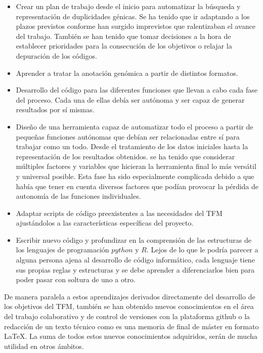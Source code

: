 \begin{itemize}
    \item Crear un plan de trabajo desde el inicio para automatizar la búsqueda y representación de duplicidades génicas. Se ha tenido que ir adaptando a los plazos previstos conforme han surgido imprevistos que ralentizaban el avance del trabajo. También se han tenido que tomar decisiones a la hora de establecer prioridades para la consecución de los objetivos o relajar la depuración de los códigos.
    \item Aprender a tratar la anotación genómica a partir de distintos formatos. 
    \item Desarrollo del código para las diferentes funciones que llevan a cabo cada fase del proceso. Cada una de ellas debía ser autónoma y ser capaz de generar resultados por sí mismas. 
    \item Diseño de una herramienta capaz de automatizar todo el proceso a partir de pequeñas funciones autónomas que debían ser relacionadas entre sí para trabajar como un todo. Desde el tratamiento de los datos iniciales hasta la representación de los resultados obtenidos. se ha tenido que considerar múltiples factores y variables que hicieran la herramienta final lo más versátil y universal posible. Esta fase ha sido especialmente complicada debido a que había que tener en cuenta diversos factores que podían provocar la pérdida de autonomía de las funciones individuales.
    \item Adaptar scripts de código preexistentes a las necesidades del TFM ajustándolos a las características específicas del proyecto.
    \item Escribir nuevo código y profundizar en la comprensión de las estructuras de los lenguajes de programación $python$ y $R$. Lejos de lo que le podría parecer a alguna persona ajena al desarrollo de código informático, cada lenguaje tiene sus propias reglas y estructuras y se debe aprender a diferenciarlos bien para poder pasar con soltura de uno a otro.
\end{itemize}

De manera paralela a estos aprendizajes derivados directamente del desarrollo de los objetivos del TFM, también se han obtenido nuevos conocimientos en el área del trabajo colaborativo y de control de versiones con la plataforma github o la redacción de un texto técnico como es una memoria de final de máster en formato \LaTeX{}. La suma de todos estos nuevos conocimientos adquiridos, serán de mucha utilidad en otros ámbitos.

